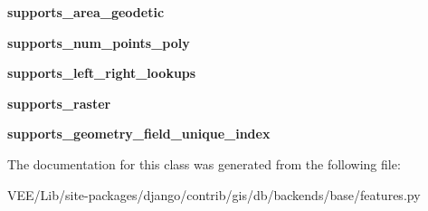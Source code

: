 \begin{DoxyCompactItemize}
{\bfseries supports\+\_\+area\+\_\+geodetic}
\item 
\mbox{\label{classdjango_1_1contrib_1_1gis_1_1db_1_1backends_1_1base_1_1features_1_1_base_spatial_features_a760775c7bd58b8a4eecfe0f1eeab7491}} 
{\bfseries supports\+\_\+num\+\_\+points\+\_\+poly}
\item 
\mbox{\label{classdjango_1_1contrib_1_1gis_1_1db_1_1backends_1_1base_1_1features_1_1_base_spatial_features_a17d63f7578790ffdc605ff71cfb04deb}} 
{\bfseries supports\+\_\+left\+\_\+right\+\_\+lookups}
\item 
\mbox{\label{classdjango_1_1contrib_1_1gis_1_1db_1_1backends_1_1base_1_1features_1_1_base_spatial_features_a031685831c76138af307a056723d85a3}} 
{\bfseries supports\+\_\+raster}
\item 
\mbox{\label{classdjango_1_1contrib_1_1gis_1_1db_1_1backends_1_1base_1_1features_1_1_base_spatial_features_a216f6b54ac944dc4f15d0b8bc5c190bf}} 
{\bfseries supports\+\_\+geometry\+\_\+field\+\_\+unique\+\_\+index}
\end{DoxyCompactItemize}


The documentation for this class was generated from the following file\+:\begin{DoxyCompactItemize}
\item 
V\+E\+E/\+Lib/site-\/packages/django/contrib/gis/db/backends/base/features.\+py\end{DoxyCompactItemize}
